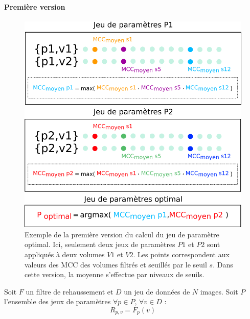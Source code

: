   \paragraph{Première version}

  \begin{figure}[!ht]
    \centering
    \includegraphics[width=\textwidth]{Images/optim_v1.png}
    \caption{Exemple de la première version du calcul du jeu de paramètre optimal. Ici, seulement deux jeux de paramètres $P1$ et $P2$ sont appliqués à deux volumes $V1$ et $V2$. Les points correspondent aux valeurs des MCC des volumes filtrés et seuillés par le seuil $s$. Dans cette version, la moyenne s'effectue par niveaux de seuils.}
    \label{fig:optim_v1}
  \end{figure}

  Soit $F$ un filtre de rehaussement et $D$ un jeu de données de $N$ images. Soit $P$ l'ensemble des jeux de paramètres
  $\forall p \in P$, $\forall v \in D$ :
  \begin{equation}
    R_{p,v} = F_{p}(v)
  \end{equation}

